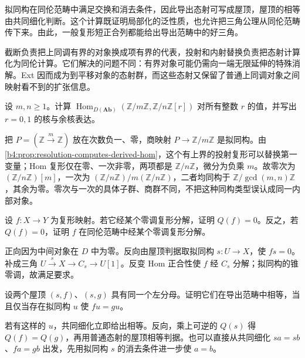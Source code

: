 




\begin{chaptersummary}
	拟同构在同伦范畴中满足交换和消去条件，因此导出态射可写成屋顶，屋顶的相等由共同细化判断。这个计算既证明局部化的泛性质，也允许把三角公理从同伦范畴传下来。由此，一般复形短正合列都能给出导出范畴中的好三角。

	\ProseParagraphBreak
	截断负责把上同调有界的对象换成项有界的代表，投射和内射替换负责把态射计算化为同伦计算。它们解决的问题不同：有界对象可能仍需向一端无限延伸的特殊消解。Ext 因而成为到平移对象的态射群，而这些态射又保留了普通上同调对象之间映射看不到的扩张信息。
\end{chaptersummary}

\BookExercises

\begin{exercise}\label{b4:ex:17-cyclic-ext}
	设 \(m,n\ge1\)。计算 \(\operatorname{Hom}_{D(\mathbf{Ab})}(\mathbb Z/m\mathbb Z,\mathbb Z/n\mathbb Z[r])\) 对所有整数 \(r\) 的值，并写出 \(r=0,1\) 的核与余核表达。
\end{exercise}
\begin{solution}
	把 \(P=(\mathbb Z\xrightarrow{m}\mathbb Z)\) 放在次数负一、零，商映射 \(P\to\mathbb Z/m\mathbb Z\) 是拟同构。由\cref{b4:prop:resolution-computes-derived-hom}，这个有上界的投射复形可以替换第一变量；Hom 复形仅在零、一次非零，两项都是 \(\mathbb Z/n\mathbb Z\)，微分为负乘 \(m\)。故零次为 \((\mathbb Z/n\mathbb Z)[m]\)，一次为 \((\mathbb Z/n\mathbb Z)/m(\mathbb Z/n\mathbb Z)\)，二者均同构于 \(\mathbb Z/\gcd(m,n)\mathbb Z\)，其余为零。零次与一次的具体子群、商群不同，不把这种同构类型误认成同一内部对象。
\end{solution}

\begin{exercise}\label{b4:ex:17-roof-localize-zero}
	设 \(f:X\to Y\) 为复形映射。若它经某个零调复形分解，证明 \(Q(f)=0\)。反之，若 \(Q(f)=0\)，证明 \(f\) 在同伦范畴中经某个零调复形分解。
\end{exercise}
\begin{solution}
	正向因为中间对象在 \(D\) 中为零。反向由屋顶判据取拟同构 \(s:U\to X\)，使 \(fs=0\)。补成三角 \(U\xrightarrow{s}X\to C_s\to U[1]\)。反变 Hom 正合性使 \(f\) 经 \(C_s\) 分解；拟同构的锥零调，故满足要求。
\end{solution}

\begin{exercise}\label{b4:ex:17-roof-two-denominators}
	设两个屋顶 \((s,f)\)、\((s,g)\) 具有同一个左分母。证明它们在导出范畴中相等，当且仅当存在拟同构 \(u\) 使 \(fu=gu\)。
\end{exercise}
\begin{solution}
	若有这样的 \(u\)，共同细化立即给出相等。反向，乘上可逆的 \(Q(s)\) 得 \(Q(f)=Q(g)\)，再用普通态射的屋顶相等判据。也可以直接从共同细化 \(sa=sb\)、\(fa=gb\) 出发，先用拟同构 \(s\) 的消去条件进一步使 \(a=b\)。
\end{solution}

